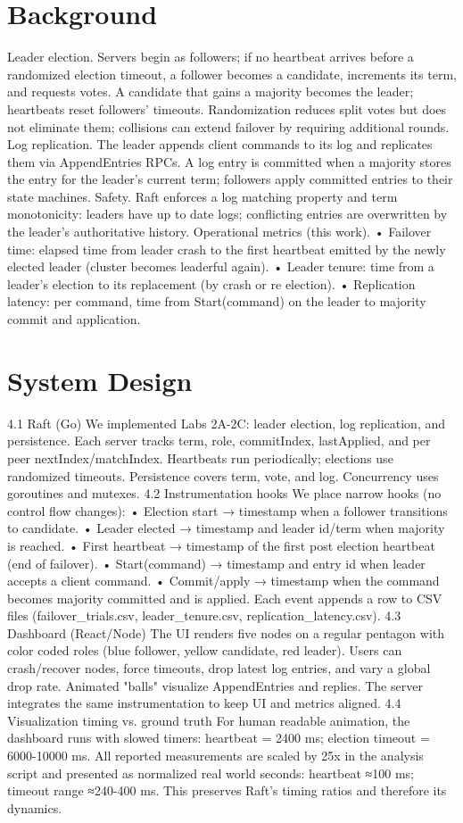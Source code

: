\documentclass[11pt]{article}
\begin{document}
\section{Background}
Leader election. Servers begin as followers; if no heartbeat arrives before a randomized election timeout, a follower becomes a candidate, increments its term, and requests votes. A candidate that gains a majority becomes the leader; heartbeats reset followers' timeouts. Randomization reduces split votes but does not eliminate them; collisions can extend failover by requiring additional rounds.
Log replication. The leader appends client commands to its log and replicates them via AppendEntries RPCs. A log entry is committed when a majority stores the entry for the leader's current term; followers apply committed entries to their state machines.
Safety. Raft enforces a log matching property and term monotonicity: leaders have up to date logs; conflicting entries are overwritten by the leader's authoritative history.
Operational metrics (this work).
•	Failover time: elapsed time from leader crash to the first heartbeat emitted by the newly elected leader (cluster becomes leaderful again).
•	Leader tenure: time from a leader's election to its replacement (by crash or re election).
•	Replication latency: per command, time from Start(command) on the leader to majority commit and application.

\section{System Design}
4.1 Raft (Go)
We implemented Labs 2A-2C: leader election, log replication, and persistence. Each server tracks term, role, commitIndex, lastApplied, and per peer nextIndex/matchIndex. Heartbeats run periodically; elections use randomized timeouts. Persistence covers term, vote, and log. Concurrency uses goroutines and mutexes.
4.2 Instrumentation hooks
We place narrow hooks (no control flow changes):
•	Election start → timestamp when a follower transitions to candidate.
•	Leader elected → timestamp and leader id/term when majority is reached.
•	First heartbeat → timestamp of the first post election heartbeat (end of failover).
•	Start(command) → timestamp and entry id when leader accepts a client command.
•	Commit/apply → timestamp when the command becomes majority committed and is applied.
Each event appends a row to CSV files (failover_trials.csv, leader_tenure.csv, replication_latency.csv).
4.3 Dashboard (React/Node)
The UI renders five nodes on a regular pentagon with color coded roles (blue follower, yellow candidate, red leader). Users can crash/recover nodes, force timeouts, drop latest log entries, and vary a global drop rate. Animated "balls" visualize AppendEntries and replies. The server integrates the same instrumentation to keep UI and metrics aligned.
4.4 Visualization timing vs. ground truth
For human readable animation, the dashboard runs with slowed timers: heartbeat = 2400 ms; election timeout = 6000-10000 ms. All reported measurements are scaled by 25x in the analysis script and presented as normalized real world seconds: heartbeat ≈100 ms; timeout range ≈240-400 ms. This preserves Raft's timing ratios and therefore its dynamics.
\end{document}
